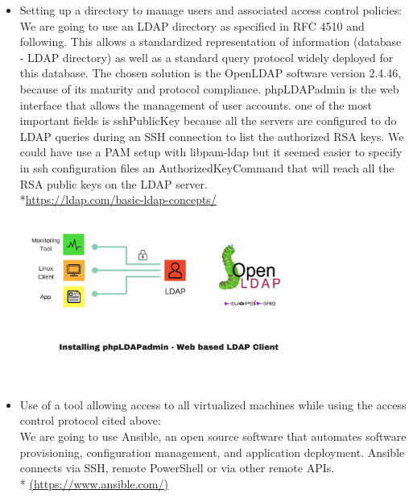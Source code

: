 \begin{itemize}
\begin{center}
  \end{center}

  \pagebreak

\item
  Setting up a directory to manage users and associated access control policies:
    \\

  We are going to use an LDAP directory as specified in RFC 4510 and following.
  This allows a standardized representation of information (database - LDAP directory) as well as a standard query protocol widely deployed for this database.
  The chosen solution is the OpenLDAP software version 2.4.46, because of its
    maturity and protocol compliance. phpLDAPadmin is the web interface that
    allows the management of user accounts. one of the most important fields is
    sshPublicKey because all the servers are configured to do LDAP queries
    during an SSH connection to list the authorized RSA keys.
    We could have use a PAM setup with libpam-ldap but it seemed easier to specify
    in ssh configuration files an AuthorizedKeyCommand that will reach all the
    RSA public keys on the LDAP server.
  \\ 
  *\url{https://ldap.com/basic-ldap-concepts/}

  \begin{center}

  \includegraphics[width=0.75\textwidth]{images/ldap-example.jpg}

  \end{center}

\item
  Use of a tool allowing access to all virtualized machines while using the
    access control protocol cited above: \\

  We are going to use Ansible, an open source software that automates software
  provisioning, configuration management, and application deployment.
  Ansible connects via SSH, remote PowerShell or via other remote APIs.\\ *
  \url{(https://www.ansible.com/)}


\end{itemize}
